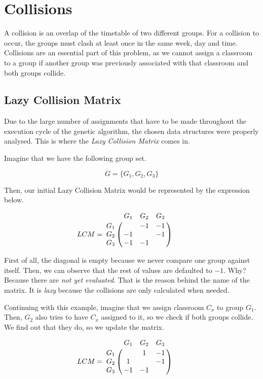 \section{Collisions}

A collision is an overlap of the timetable of two different groups. For a collision to occur, the groups must clash at least once in the same week, day and time. Collisions are an essential part of this problem, as we cannot assign a classroom to a group if another group was previously associated with that classroom and both groups collide.

\subsection{Lazy Collision Matrix}\label{lcm}

Due to the large number of assignments that have to be made throughout the execution cycle of the genetic algorithm, the chosen data structures were properly analysed. This is where the \textit{Lazy Collision Matrix} comes in.

Imagine that we have the following group set.

\begin{equation}
    G = \{ G_{1}, G_{2}, G_{3} \}
\end{equation}

Then, our initial Lazy Collision Matrix would be represented by the expression below.

\begin{equation}
    LCM = \bordermatrix{
        & G_{1} & G_{2} & G_{3} \cr
        G_{1} &  & -1 & -1 \cr
        G_{2} & -1 &  & -1 \cr
        G_{3} & -1 & -1 & 
    } \qquad
\end{equation}

First of all, the diagonal is empty because we never compare one group against itself. Then, we can observe that the rest of values are defaulted to $-1$. Why? Because there are \textit{not yet evaluated}. That is the reason behind the name of the matrix. It is \textit{lazy} because the collisions are only calculated when needed.

Continuing with this example, imagine that we assign classroom $C_{x}$ to group $G_{1}$. Then, $G_{2}$ also tries to have $C_{x}$ assigned to it, so we check if both groups collide. We find out that they do, so we update the matrix.

\begin{equation}
    LCM = \bordermatrix{
        & G_{1} & G_{2} & G_{3} \cr
        G_{1} &  & 1 & -1 \cr
        G_{2} & 1 &  & -1 \cr
        G_{3} & -1 & -1 & 
    } \qquad
\end{equation}

